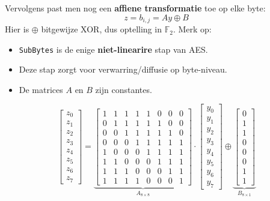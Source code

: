 \begin{center}
\resizebox{0.8\textwidth}{!}{%
    
}
\end{center}

Vervolgens past men nog een \textbf{affiene transformatie} toe op elke byte:
\begin{equation*}
    z = b_{i,j} = Ay \oplus B
\end{equation*}
Hier is $\oplus$ bitgewijze XOR, dus optelling in $\mathbb{F}_2$. Merk op:
\begin{itemize}
    \item \texttt{SubBytes} is de enige \textbf{niet-linearire} stap van AES.
    \item Deze stap zorgt voor verwarring/diffusie op byte-niveau.
    \item De matrices $A$ en $B$ zijn constantes.
\end{itemize}
\begin{equation*}
    \begin{bmatrix}
            z_0 \\ z_1 \\ z_2 \\ z_3 \\ z_4 \\ z_5 \\ z_6 \\ z_7
        \end{bmatrix} = \underbrace{\begin{bmatrix}
            1 & 1 & 1 & 1 & 1 & 0 & 0 & 0 \\
            0 & 1 & 1 & 1 & 1 & 1 & 0 & 0 \\
            0 & 0 & 1 & 1 & 1 & 1 & 1 & 0 \\
            0 & 0 & 0 & 1 & 1 & 1 & 1 & 1 \\
            1 & 0 & 0 & 0 & 1 & 1 & 1 & 1 \\
            1 & 1 & 0 & 0 & 0 & 1 & 1 & 1 \\
            1 & 1 & 1 & 0 & 0 & 0 & 1 & 1 \\
            1 & 1 & 1 & 1 & 0 & 0 & 0 & 1 
        \end{bmatrix}}_{A_{8 \times 8}} \cdot \begin{bmatrix}
            y_0 \\ y_1 \\ y_2 \\ y_3 \\ y_4 \\ y_5 \\ y_6 \\ y_7
        \end{bmatrix} \oplus \underbrace{\begin{bmatrix}
            0 \\ 1 \\ 1 \\ 0 \\ 0 \\ 0 \\ 1 \\ 1
    \end{bmatrix}}_{B_{8 \times 1}}
\end{equation*}

